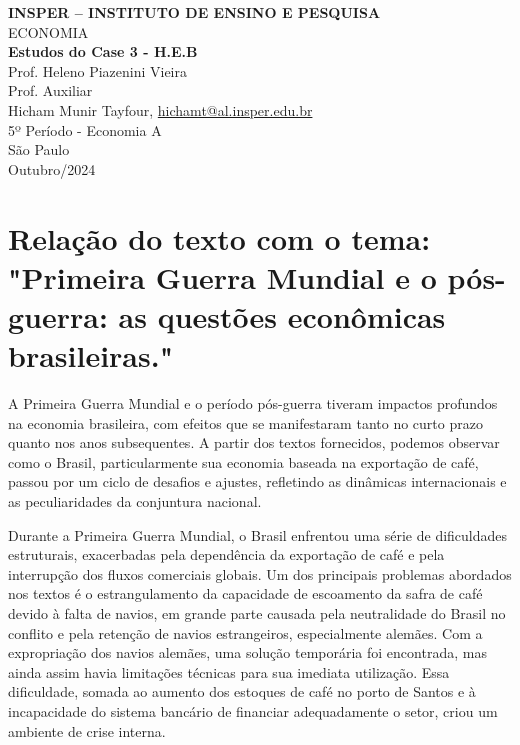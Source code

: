 \documentclass[a4paper,12pt]{article}[abntex2]
\begin{document}
\begin{titlepage}
    \centering
    \vspace*{1cm}
    \Large\textbf{INSPER – INSTITUTO DE ENSINO E PESQUISA}\\
    \Large ECONOMIA\\
    \vspace{1.5cm}
    \Large\textbf{Estudos do Case 3 - H.E.B}\\
    \vspace{1.5cm}
    Prof. Heleno Piazenini Vieira\\
    Prof. Auxiliar \\
    \vfill
    \normalsize
    Hicham Munir Tayfour, \href{mailto:hichamt@al.insper.edu.br}{hichamt@al.insper.edu.br}\\
    5º Período - Economia A\\
    \vfill
    São Paulo\\
    Outubro/2024
\end{titlepage}

\newpage
\tableofcontents
\thispagestyle{empty} %
\newpage
\setcounter{page}{1} %
\justify
\onehalfspacing

\pagestyle{fancy}
\fancyhf{}
\rhead{\thepage}


\section{\textbf{Relação do texto com o tema: "Primeira Guerra Mundial e o pós-guerra: as questões econômicas brasileiras."}}

A Primeira Guerra Mundial e o período pós-guerra tiveram impactos profundos na economia brasileira, com efeitos que se manifestaram tanto no curto prazo quanto nos anos subsequentes. A partir dos textos fornecidos, podemos observar como o Brasil, particularmente sua economia baseada na exportação de café, passou por um ciclo de desafios e ajustes, refletindo as dinâmicas internacionais e as peculiaridades da conjuntura nacional.

Durante a Primeira Guerra Mundial, o Brasil enfrentou uma série de dificuldades estruturais, exacerbadas pela dependência da exportação de café e pela interrupção dos fluxos comerciais globais. Um dos principais problemas abordados nos textos é o estrangulamento da capacidade de escoamento da safra de café devido à falta de navios, em grande parte causada pela neutralidade do Brasil no conflito e pela retenção de navios estrangeiros, especialmente alemães. Com a expropriação dos navios alemães, uma solução temporária foi encontrada, mas ainda assim havia limitações técnicas para sua imediata utilização. Essa dificuldade, somada ao aumento dos estoques de café no porto de Santos e à incapacidade do sistema bancário de financiar adequadamente o setor, criou um ambiente de crise interna.
\end{document}
